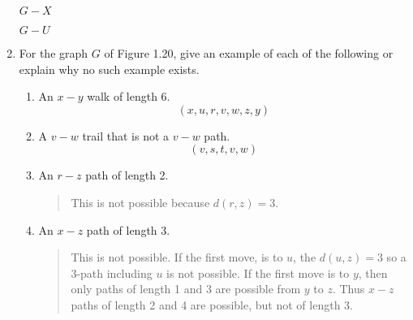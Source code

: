 \documentclass[letterpaper,12pt,fleqn]{article}
\begin{document}
\begin{enumerate}[start=11]
\begin{minipage}{3in}
\begin{center}
      \bigskip

      \(G-X\)
    \end{center}
  \end{minipage}
  \begin{minipage}{3in}
    \begin{center}

      \bigskip

      \(G-U\)
    \end{center}
  \end{minipage}

  \bigskip

\item For the graph \(G\) of Figure 1.20, give an example of each of the following or explain why no such example
  exists.
  \begin{enumerate}
  \item An \(x-y\) walk of length 6.
    \[(x,u,r,v,w,z,y)\]

  \item A \(v-w\) trail that is not a \(v-w\) path.
    \[(v,s,t,v,w)\]

  \item An \(r-z\) path of length 2.
    \begin{quote}
      This is not possible because \(d(r,z)=3\).
    \end{quote}

  \item An \(x-z\) path of length 3.
    \begin{quote}
      This is not possible.  If the first move, is to \(u\), the \(d(u,z)=3\) so a 3-path including \(u\) is not
      possible.  If the first move is to \(y\), then only paths of length 1 and 3 are possible from \(y\) to \(z\).
      Thus \(x-z\) paths of length 2 and 4 are possible, but not of length 3.
    \end{quote}


\end{enumerate}
\end{enumerate}
\end{document}
